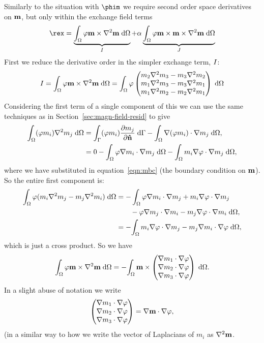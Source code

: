 Similarly to the situation with $\phim$ we require second order space derivatives on $\mathbf{m}$, but only within the exchange field terms
\begin{equation}
  \rex = \underbrace{\intd{\tbf \mv \times \lap \mv}}_{\mxex}
  + \dampc \underbrace{\intd{\tbf \mv \times \mv \times \lap \mv}}_{\mxmxex}
  \label{eqn:exresterms}
\end{equation}
First we reduce the derivative order in the simpler exchange term, $I$:
\begin{equation}
  I =
  {\int_{\Omega} \varphi \mathbf{m} \times \nabla^2 \mathbf{m} {\; \text{d}} {\Omega}} =
  {\int_{\Omega} \varphi \begin{pmatrix} m_2 \nabla^2 m_3 - m_3 \nabla^2 m_2  \\ m_1 \nabla^2 m_3 - m_3 \nabla^2 m_1  \\ m_1 \nabla^2 m_2 - m_2 \nabla^2 m_1  \end{pmatrix} {\; \text{d}} {\Omega}}
  \notag
\end{equation}
Considering the first term of a single component of this we can use the same techniques as in Section~\ref{sec:magn-field-resid} to give
\begin{align}
  {\int_{\Omega} (\varphi m_i) \nabla^2m_j {\; \text{d}}{\Omega}}
  &= \int_{\Gamma} (\varphi m_i) \frac{\partial m_j}{\partial \mathbf{\hat{n}}} {\; \text{d}}{\Gamma}
  - {\int_{\Omega} \nabla(\varphi m_i) \cdot \nabla m_j {\; \text{d}} {\Omega}}, \notag \\
  &= 0 - {\int_{\Omega} \varphi \nabla m_i \cdot \nabla m_j {\; \text{d}} {\Omega}}
  -  {\int_{\Omega} m_i \nabla \varphi \cdot \nabla m_j {\; \text{d}} {\Omega}}, \notag
\end{align}
where we have substituted in equation~\eqref{eqn:mbc} (the boundary condition on $\mathbf{m}$).
So the entire first component is:
\begin{equation}
  \begin{aligned}
    {\int_{\Omega} \varphi(m_i \nabla^2m_j - m_j \nabla^2m_i) {\; \text{d}}{\Omega}}
    &= - \int_\Omega \varphi \nabla m_i \cdot \nabla m_j
    +  m_i \nabla \varphi \cdot \nabla m_j \\
    & \qquad - \varphi \nabla m_j \cdot \nabla m_i
    -  m_j \nabla \varphi \cdot \nabla m_i {\; \text{d}}\Omega, \\
    &= -{\int_{\Omega} m_i \nabla \varphi \cdot \nabla m_j - m_j \nabla m_i  \cdot \nabla \varphi {\; \text{d}} {\Omega}},
  \end{aligned}
\end{equation}
which is just a cross product.
So we have
\begin{equation}
  {\int_{\Omega} \varphi\mathbf{m}\times \nabla^2\mathbf{m}{\; \text{d}}{\Omega}} =
  -{\int_{\Omega} \mathbf{m} \times \begin{pmatrix} \nabla m_1 \cdot \nabla \varphi \\ \nabla m_2 \cdot \nabla \varphi \\ \nabla m_3 \cdot \nabla \varphi \end{pmatrix} {\; \text{d}} {\Omega}}.
\end{equation}
In a slight abuse of notation we write
\begin{equation}
  \begin{pmatrix} \nabla m_1 \cdot \nabla \varphi \\ \nabla m_2 \cdot \nabla \varphi \\ \nabla m_3 \cdot \nabla \varphi \end{pmatrix} = \nabla \mathbf{m} \cdot \nabla \varphi,
  \label{eqn:gradvecm}
\end{equation}
(in a similar way to how we write the vector of Laplacians of $m_i$ as $\nabla^2 \mathbf{m}$.

